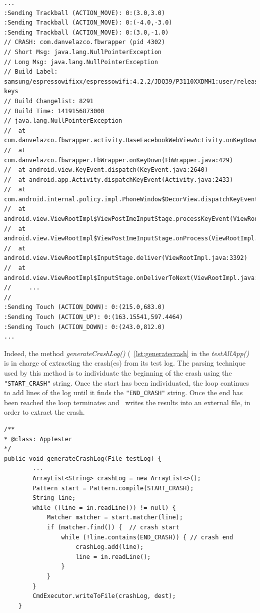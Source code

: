 \begin{lstlisting}[caption=Crash log of com.danvelazco.fbwrapper illustrated within its test log, basicstyle=\fontsize{6}{8}\ttfamily,label={lst:crashlog}]
...
:Sending Trackball (ACTION_MOVE): 0:(3.0,3.0)
:Sending Trackball (ACTION_MOVE): 0:(-4.0,-3.0)
:Sending Trackball (ACTION_MOVE): 0:(3.0,-1.0)
// CRASH: com.danvelazco.fbwrapper (pid 4302)
// Short Msg: java.lang.NullPointerException
// Long Msg: java.lang.NullPointerException
// Build Label: samsung/espressowifixx/espressowifi:4.2.2/JDQ39/P3110XXDMH1:user/release-keys
// Build Changelist: 8291
// Build Time: 1419156873000
// java.lang.NullPointerException
// 	at com.danvelazco.fbwrapper.activity.BaseFacebookWebViewActivity.onKeyDown(BaseFacebookWebViewActivity.java:649)
// 	at com.danvelazco.fbwrapper.FbWrapper.onKeyDown(FbWrapper.java:429)
// 	at android.view.KeyEvent.dispatch(KeyEvent.java:2640)
// 	at android.app.Activity.dispatchKeyEvent(Activity.java:2433)
// 	at com.android.internal.policy.impl.PhoneWindow$DecorView.dispatchKeyEvent(PhoneWindow.java:2021)
// 	at android.view.ViewRootImpl$ViewPostImeInputStage.processKeyEvent(ViewRootImpl.java:3845)
// 	at android.view.ViewRootImpl$ViewPostImeInputStage.onProcess(ViewRootImpl.java:3819)
// 	at android.view.ViewRootImpl$InputStage.deliver(ViewRootImpl.java:3392)
// 	at android.view.ViewRootImpl$InputStage.onDeliverToNext(ViewRootImpl.java:3442)
//     ...
//
:Sending Touch (ACTION_DOWN): 0:(215.0,683.0)
:Sending Touch (ACTION_UP): 0:(163.15541,597.4464)
:Sending Touch (ACTION_DOWN): 0:(243.0,812.0)
...

\end{lstlisting} 
Indeed, the method \textit{generateCrashLog()} (~\ref{lst:generatecrash} in the \textit{testAllApp()} is in charge of extracting the crash(es) from its test log. The parsing technique used by this method is to individuate the beginning of the crash using the \texttt{"START\_CRASH"}  string. Once the start has been individuated, the loop continues to add lines of the log	until it finds the \texttt{"END\_CRASH"} string. Once the end has been reached the loop terminates and \Cmd\ writes the results into an external file, in order to extract the crash. 

\begin{lstlisting}[caption=\AppTester's method for extracting a crash log from its test log,label={lst:generatecrash}]
/**
* @class: AppTester
*/
public void generateCrashLog(File testLog) {
        ...
        ArrayList<String> crashLog = new ArrayList<>();
        Pattern start = Pattern.compile(START_CRASH);
        String line;
        while ((line = in.readLine()) != null) {
            Matcher matcher = start.matcher(line);
            if (matcher.find()) {  // crash start
                while (!line.contains(END_CRASH)) { // crash end
                    crashLog.add(line);
                    line = in.readLine();
                }
            }
        }
        CmdExecutor.writeToFile(crashLog, dest);
    }
\end{lstlisting} 



